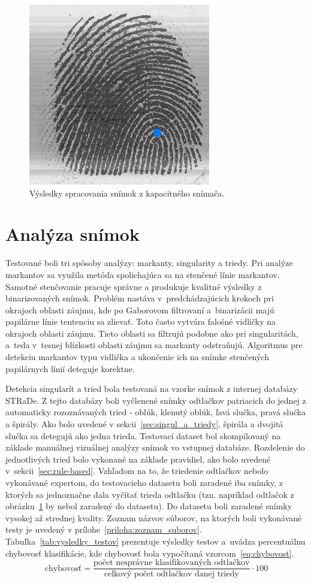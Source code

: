 \begin{figure}[h]
    \includegraphics[width=0.32\linewidth]{obrazky-figures/eval_results/capac_singularities.png}
    \caption{Výsledky spracovania snímok z kapacitného snímača.}
    \label{obr:vyhodnotenie_capac}
  \end{figure}

  \section{Analýza snímok}
  Testované boli tri spôsoby analýzy: markanty, singularity a triedy. Pri analýze markantov sa využila metóda spoliehajúca sa na stenčené línie markantov.
  Samotné stenčovanie pracuje správne a produkuje kvalitné výsledky z binarizovaných snímok. Problém nastáva v~predchádzajúcich krokoch pri okrajoch oblasti
  záujmu, kde po Gaborovom filtrovaní a~binarizácii majú papilárne línie tentenciu sa zlievať. Toto často vytvára falošné vidličky na okrajoch oblasti
  záujmu. Tieto oblasti sa filtrujú podobne ako pri singularitách, a~teda v~tesnej blízkosti oblasti záujmu sa markanty odstraňujú.
  Algoritmus pre detekciu markantov typu vidlička a ukončenie ich na snímke stenčených papilárnych línií deteguje korektne.

  Detekcia singularít a tried bola testovaná na vzorke snímok z internej databázy STRaDe. Z tejto databázy boli vyčlenené snímky odtlačkov patriacich do
  jednej z automaticky rozoznávaných tried - oblúk, klenutý oblúk, ľavá slučka, pravá slučka a špirály. Ako bolo uvedené v sekcii~{\ref{sec:singul_a_triedy}},
  špirála a dvojitá slučka sa detegujú ako jedna trieda. Testovací dataset bol skompilovaný na základe manuálnej vizuálnej analýzy snímok vo vstupnej
  databáze. Rozdelenie do jednotlivých tried bolo vykonané na základe pravidiel, ako bolo uvedené v~sekcii~{\ref{sec:rule-based}}. Vzhľadom na to, že
  triedenie odtlačkov nebolo vykonávané expertom, do testovacieho datasetu boli zaradené iba snímky, z ktorých sa jednoznačne dala vyčítať trieda odtlačku
  (tzn. napríklad odtlačok z obrázku~{\ref{obr:vyhodnotenie_capac}} by nebol zaradený do datasetu).
  Do datasetu boli zaradené snímky vysokej až strednej kvality. Zoznam názvov súborov, na ktorých boli vykonávané testy je uvedený v
  prílohe~{\ref{priloha:zoznam_suborov}}. Tabuľka~{\ref{tab:vysledky_testov}} prezentuje výsledky testov a~uvádza percentuálnu chybovosť klasifikácie, kde
  chybovosť bola vypočítaná vzorcom~{\ref{eq:chybovost}}.
  \begin{equation}
    \text{chybovosť} = \frac{\text{počet nesprávne klasifikovaných odtlačkov}}{\text{celkový počet odtlačkov danej triedy}} \cdot 100
    \label{eq:chybovost}
  \end{equation}

